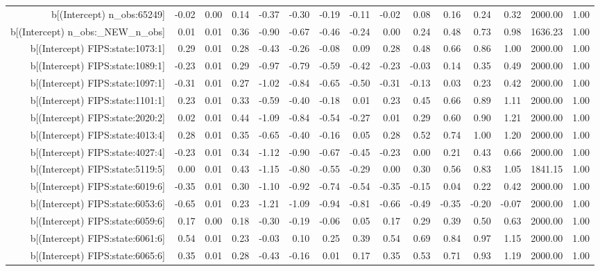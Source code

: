 \begin{table}[ht]
\begin{tabular}{rrrrrrrrrrrrrrr}
  b[(Intercept) n\_obs:65249] & -0.02 & 0.00 & 0.14 & -0.37 & -0.30 & -0.19 & -0.11 & -0.02 & 0.08 & 0.16 & 0.24 & 0.32 & 2000.00 & 1.00 \\ 
  b[(Intercept) n\_obs:\_NEW\_n\_obs] & 0.01 & 0.01 & 0.36 & -0.90 & -0.67 & -0.46 & -0.24 & 0.00 & 0.24 & 0.48 & 0.73 & 0.98 & 1636.23 & 1.00 \\ 
  b[(Intercept) FIPS:state:1073:1] & 0.29 & 0.01 & 0.28 & -0.43 & -0.26 & -0.08 & 0.09 & 0.28 & 0.48 & 0.66 & 0.86 & 1.00 & 2000.00 & 1.00 \\ 
  b[(Intercept) FIPS:state:1089:1] & -0.23 & 0.01 & 0.29 & -0.97 & -0.79 & -0.59 & -0.42 & -0.23 & -0.03 & 0.14 & 0.35 & 0.49 & 2000.00 & 1.00 \\ 
  b[(Intercept) FIPS:state:1097:1] & -0.31 & 0.01 & 0.27 & -1.02 & -0.84 & -0.65 & -0.50 & -0.31 & -0.13 & 0.03 & 0.23 & 0.42 & 2000.00 & 1.00 \\ 
  b[(Intercept) FIPS:state:1101:1] & 0.23 & 0.01 & 0.33 & -0.59 & -0.40 & -0.18 & 0.01 & 0.23 & 0.45 & 0.66 & 0.89 & 1.11 & 2000.00 & 1.00 \\ 
  b[(Intercept) FIPS:state:2020:2] & 0.02 & 0.01 & 0.44 & -1.09 & -0.84 & -0.54 & -0.27 & 0.01 & 0.29 & 0.60 & 0.90 & 1.21 & 2000.00 & 1.00 \\ 
  b[(Intercept) FIPS:state:4013:4] & 0.28 & 0.01 & 0.35 & -0.65 & -0.40 & -0.16 & 0.05 & 0.28 & 0.52 & 0.74 & 1.00 & 1.20 & 2000.00 & 1.00 \\ 
  b[(Intercept) FIPS:state:4027:4] & -0.23 & 0.01 & 0.34 & -1.12 & -0.90 & -0.67 & -0.45 & -0.23 & 0.00 & 0.21 & 0.43 & 0.66 & 2000.00 & 1.00 \\ 
  b[(Intercept) FIPS:state:5119:5] & 0.00 & 0.01 & 0.43 & -1.15 & -0.80 & -0.55 & -0.29 & 0.00 & 0.30 & 0.56 & 0.83 & 1.05 & 1841.15 & 1.00 \\ 
  b[(Intercept) FIPS:state:6019:6] & -0.35 & 0.01 & 0.30 & -1.10 & -0.92 & -0.74 & -0.54 & -0.35 & -0.15 & 0.04 & 0.22 & 0.42 & 2000.00 & 1.00 \\ 
  b[(Intercept) FIPS:state:6053:6] & -0.65 & 0.01 & 0.23 & -1.21 & -1.09 & -0.94 & -0.81 & -0.66 & -0.49 & -0.35 & -0.20 & -0.07 & 2000.00 & 1.00 \\ 
  b[(Intercept) FIPS:state:6059:6] & 0.17 & 0.00 & 0.18 & -0.30 & -0.19 & -0.06 & 0.05 & 0.17 & 0.29 & 0.39 & 0.50 & 0.63 & 2000.00 & 1.00 \\ 
  b[(Intercept) FIPS:state:6061:6] & 0.54 & 0.01 & 0.23 & -0.03 & 0.10 & 0.25 & 0.39 & 0.54 & 0.69 & 0.84 & 0.97 & 1.15 & 2000.00 & 1.00 \\ 
  b[(Intercept) FIPS:state:6065:6] & 0.35 & 0.01 & 0.28 & -0.43 & -0.16 & 0.01 & 0.17 & 0.35 & 0.53 & 0.71 & 0.93 & 1.19 & 2000.00 & 1.00 \\ 

\end{tabular}
\end{table}
